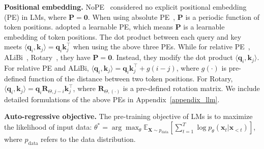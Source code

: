 \textbf{Positional embedding.} NoPE~\citep{kazemnejad2024impact} considered no explicit positional embedding (PE) in LMs, where $\boldsymbol{P}=\boldsymbol{0}$. When using absolute PE~\citep{vaswani2017attention}, $\boldsymbol{P}$ is a periodic function of token positions. \citet{devlin2019bert,Brown2020language} adopted a learnable PE, which means $\boldsymbol{P}$ is a learnable embedding of token positions. The dot product between each query and key meets $\langle\boldsymbol{q}_i\textrm{,}\, \boldsymbol{k}_j\rangle=\boldsymbol{q}_i \boldsymbol{k}_j^\top$ when using the above three PEs. While for relative PE~\citep{raffel2020exploring}, ALiBi~\citep{press2021train}, Rotary~\citep{su2024roformer}, they have  $\boldsymbol{P}=\boldsymbol{0}$. Instead, they modify the dot product $\langle\boldsymbol{q}_i\textrm{,}\, \boldsymbol{k}_j\rangle$. For relative PE and ALiBi, $\langle\boldsymbol{q}_i\textrm{,}\, \boldsymbol{k}_j\rangle=\boldsymbol{q}_i \boldsymbol{k}_j^\top + g(i-j)$, where $g(\cdot)$ is pre-defined function of the distance between two token positions. For Rotary, $\langle\boldsymbol{q}_i\textrm{,}\, \boldsymbol{k}_j\rangle=\boldsymbol{q}_i\boldsymbol{R}_{\Theta\textrm{,}\,j-i} \boldsymbol{k}_j^\top$, where $\boldsymbol{R}_{\Theta\textrm{,}\,(\cdot)}$ is a pre-defined rotation matrix. We include detailed formulations of the above PEs in Appendix~\ref{appendix_llm}.


\textbf{Auto-regressive objective.}  The pre-training objective of LMs is to maximize the likelihood of input data: $\theta^*=\arg\max_{\theta} \mathbb{E}_{\boldsymbol{X}\sim p_{\textrm{data}}}\left[\sum_{t=1}^T\log p_{\theta}(\boldsymbol{x}_t|\boldsymbol{x}_{<t})\right]$, where $p_{\textrm{data}}$ refers to the data distribution. 





